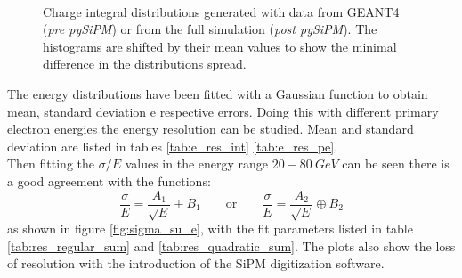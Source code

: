 \begin{figure}
	\centering
	 \\
	\caption{Charge integral distributions generated with data from GEANT4 (\textit{pre pySiPM}) or from the full simulation (\textit{post pySiPM}). The histograms are shifted by their mean values to show the minimal difference in the distributions spread.}
	\label{fig:cfr_e_dist}
\end{figure}

The energy distributions have been fitted with a Gaussian function to obtain mean, standard deviation e respective errors. Doing this with different primary electron energies the energy resolution can be studied. Mean and standard deviation are listed in tables \ref{tab:e_res_int} \ref{tab:e_res_pe}.\\
Then fitting the $\sigma/E$ values in the energy range $20-80\ GeV$ can be seen there is a good agreement with the functions:
\begin{equation}\label{eq:resolution}
	\frac{\sigma}{E} = \frac{A_1}{\sqrt{E}} + B_1 \qquad \text{or} \qquad \frac{\sigma}{E} = \frac{A_2}{\sqrt{E}} \oplus B_2
\end{equation} 
as shown in figure \ref{fig:sigma_su_e}, with the fit parameters listed in table \ref{tab:res_regular_sum} and \ref{tab:res_quadratic_sum}. The plots also show the loss of resolution with the introduction of the SiPM digitization software.\\

